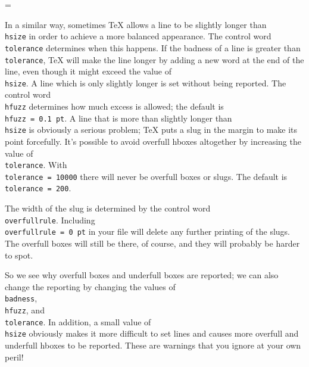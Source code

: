 \headline={\iftitlepage \hfil \global\titlepagefalse 
                                      \else \gentleheadline \fi} 

In a similar way, sometimes \TeX{} allows a line to be slightly 
longer than {\tt \\hsize} in order to achieve a more balanced 
appearance. The control word {\tt \\tolerance} determines when 
this happens.  If the badness of a line is greater than {\tt 
\\tolerance}, \TeX{} will make the line longer by adding a new word 
at the end of the line, even though it might exceed the value of 
{\tt \\hsize}. A line which is only slightly longer is set 
without being reported. The control word {\tt \\hfuzz} determines 
how much excess is allowed; the default is {\tt \\hfuzz 
=~0.1~pt}.  A line that is more than slightly longer than {\tt \\hsize} 
is obviously a serious problem; \TeX{} puts a slug in 
the margin to make its point forcefully. It's possible to avoid 
overfull hboxes altogether by increasing the value of {\tt \\tolerance}. 
With {\tt \\tolerance = 10000} there will never be 
overfull boxes or slugs. The default is {\tt \\tolerance = 200}\null. 

The width of the slug is determined by the control word {\tt 
\\overfullrule}.  Including {\tt \\overfullrule = 0 pt} in your 
file will delete any further  printing of the slugs.  The 
overfull boxes will still be there, of course, and they will 
probably be harder to spot. 

So we see why overfull boxes and underfull boxes are reported; we 
can also change the reporting by changing the values of {\tt 
\\badness}, {\tt \\hfuzz}, and {\tt \\tolerance}.  In addition, a 
small value of {\tt \\hsize} obviously makes it more difficult to 
set lines and causes more overfull and underfull hboxes to be 
reported. These are warnings that you ignore at your own peril! 


